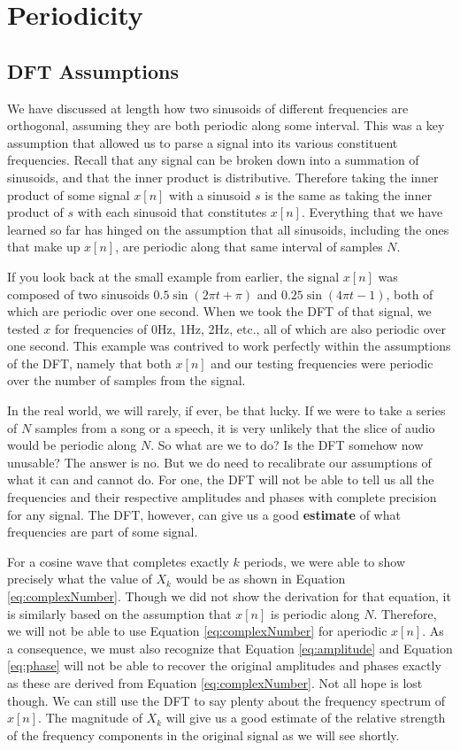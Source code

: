 \section*{Periodicity}

\subsection*{DFT Assumptions}

We have discussed at length how two sinusoids of different frequencies are orthogonal, assuming they
are both periodic along some interval.  This was a key assumption that allowed us to parse a signal into 
its various constituent frequencies.  Recall that any signal can be broken down into a summation of sinusoids,
and that the inner product is distributive.  
Therefore taking the inner product of some signal $x[n]$ with
a sinusoid $s$ is the same as taking the inner product of $s$ with each sinusoid that
constitutes $x[n]$.  Everything that we have learned so far has hinged on the assumption that all sinusoids, 
including the ones that make up $x[n]$, are periodic along that same interval of samples $N$.  

If you look back
at the small example from earlier, the signal $x[n]$ was composed of two sinusoids $0.5\sin(2\pi t + \pi)$
and $0.25\sin(4\pi t - 1)$, both of which are periodic over one second.  When we took the DFT of that signal,
we tested $x$ for frequencies of 0Hz, 1Hz, 2Hz, etc., all of which are also periodic over one second.  This
example was contrived to work perfectly within the assumptions of the DFT, namely that both $x[n]$ and
our testing frequencies were periodic over the number of samples from the signal.  

In the real world, we will rarely, if ever, be that lucky.  If we were to take a series of $N$ samples from a song
or a speech, it is very unlikely that the slice of audio would be periodic along $N$.  So what are we to do?  Is the
DFT somehow now unusable?  The answer is no.  But we do need to recalibrate our assumptions of what
it can and cannot do.  For one, the DFT will not be able to tell us all the frequencies
and their respective amplitudes and phases with complete precision for any signal.  
The DFT, however, can give us a good \textbf{estimate} of what frequencies are part of some signal.

For a cosine wave that completes exactly $k$ periods, we were able to show precisely what the value of
$X_k$ would be as shown in Equation \ref{eq:complexNumber}.  Though we did not show the derivation for 
that equation, it is similarly
based on the assumption that $x[n]$ is periodic along $N$.  Therefore,
we will not be able to use Equation \ref{eq:complexNumber} for aperiodic $x[n]$.  As a consequence, we 
must also recognize that Equation \ref{eq:amplitude} and 
Equation \ref{eq:phase} will not be able to recover the original amplitudes and phases exactly
 as these are derived from Equation \ref{eq:complexNumber}.  Not all hope is lost
though.  We can still use the DFT to say plenty about the frequency spectrum of $x[n]$.  The magnitude of 
$X_k$ will give us a good estimate of the relative strength of the frequency components in the original 
signal as we will see shortly.  

